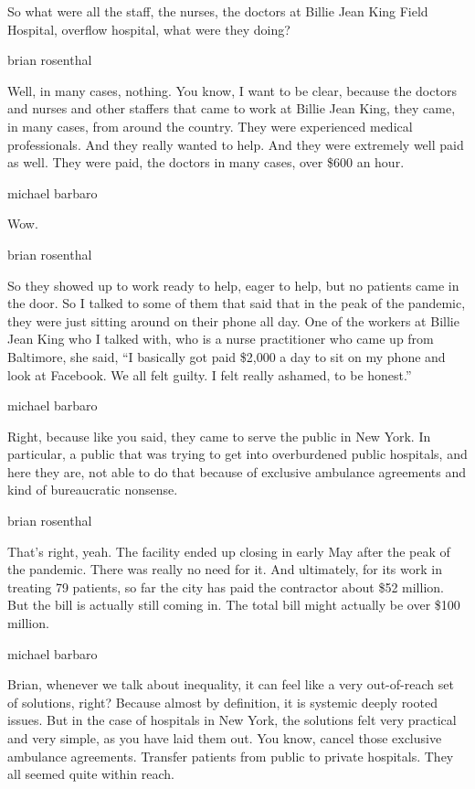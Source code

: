 So what were all the staff, the nurses, the doctors at Billie Jean King
Field Hospital, overflow hospital, what were they doing?

brian rosenthal

Well, in many cases, nothing. You know, I want to be clear, because the
doctors and nurses and other staffers that came to work at Billie Jean
King, they came, in many cases, from around the country. They were
experienced medical professionals. And they really wanted to help. And
they were extremely well paid as well. They were paid, the doctors in
many cases, over \$600 an hour.

michael barbaro

Wow.

brian rosenthal

So they showed up to work ready to help, eager to help, but no patients
came in the door. So I talked to some of them that said that in the peak
of the pandemic, they were just sitting around on their phone all day.
One of the workers at Billie Jean King who I talked with, who is a nurse
practitioner who came up from Baltimore, she said, ``I basically got
paid \$2,000 a day to sit on my phone and look at Facebook. We all felt
guilty. I felt really ashamed, to be honest.''

michael barbaro

Right, because like you said, they came to serve the public in New York.
In particular, a public that was trying to get into overburdened public
hospitals, and here they are, not able to do that because of exclusive
ambulance agreements and kind of bureaucratic nonsense.

brian rosenthal

That's right, yeah. The facility ended up closing in early May after the
peak of the pandemic. There was really no need for it. And ultimately,
for its work in treating 79 patients, so far the city has paid the
contractor about \$52 million. But the bill is actually still coming in.
The total bill might actually be over \$100 million.

michael barbaro

Brian, whenever we talk about inequality, it can feel like a very
out-of-reach set of solutions, right? Because almost by definition, it
is systemic deeply rooted issues. But in the case of hospitals in New
York, the solutions felt very practical and very simple, as you have
laid them out. You know, cancel those exclusive ambulance agreements.
Transfer patients from public to private hospitals. They all seemed
quite within reach.

